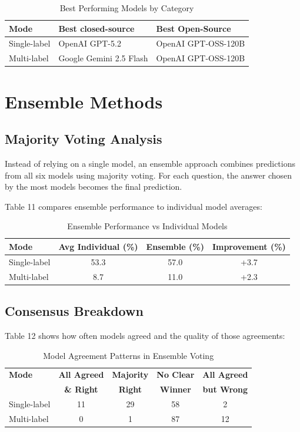 \documentclass[12pt,a4paper]{article}
\begin{document}
\begin{table}[H]
\centering
\begin{tabular}{lll}
\toprule
\textbf{Mode} & \textbf{Best closed-source} & \textbf{Best Open-Source} \\
\midrule
Single-label & OpenAI GPT-5.2 & OpenAI GPT-OSS-120B \\
Multi-label & Google Gemini 2.5 Flash & OpenAI GPT-OSS-120B \\
\bottomrule
\end{tabular}
\caption{Best Performing Models by Category}
\end{table}

\newpage

\section{Ensemble Methods}

\subsection{Majority Voting Analysis}

Instead of relying on a single model, an ensemble approach combines predictions from all six models using majority voting. For each question, the answer chosen by the most models becomes the final prediction.

Table 11 compares ensemble performance to individual model averages:

\begin{table}[H]
\centering
\begin{tabular}{lccc}
\toprule
\textbf{Mode} & \textbf{Avg Individual (\%)} & \textbf{Ensemble (\%)} & \textbf{Improvement (\%)} \\
\midrule
Single-label & 53.3 & 57.0 & +3.7 \\
Multi-label & 8.7 & 11.0 & +2.3 \\
\bottomrule
\end{tabular}
\caption{Ensemble Performance vs Individual Models}
\end{table}

\subsection{Consensus Breakdown}

Table 12 shows how often models agreed and the quality of those agreements:

\begin{table}[H]
\centering
\begin{tabular}{lcccc}
\toprule
\textbf{Mode} & \textbf{All Agreed} & \textbf{Majority} & \textbf{No Clear} & \textbf{All Agreed} \\
 & \textbf{\& Right} & \textbf{Right} & \textbf{Winner} & \textbf{but Wrong} \\
\midrule
Single-label & 11 & 29 & 58 & 2 \\
Multi-label & 0 & 1 & 87 & 12 \\
\bottomrule
\end{tabular}
\caption{Model Agreement Patterns in Ensemble Voting}
\end{table}
\end{document}

